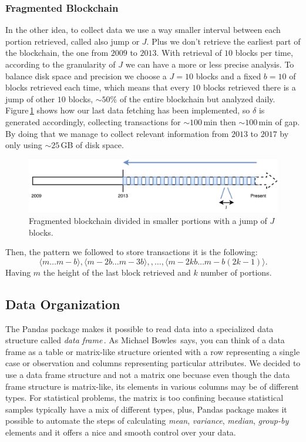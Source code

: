 \documentclass[USenglish]{uit-thesis}
\begin{document}
\subsubsection{Fragmented Blockchain}
In the other idea, to collect data we use a way smaller
interval between each portion
retrieved, called also jump or $J$. Plus
we don't retrieve the earliest part of the
blockchain, the one from $2009$ to $2013$.
With retrieval of $10$ blocks per time,
according to the granularity of $J$ we can
have a more or less precise analysis. To balance
disk space and precision we choose a $J = 10$ blocks
and a fixed $b = 10$ of blocks retrieved each time,
which means that every $10$ blocks retrieved there is
a jump of other $10$ blocks, $\sim$$50\%$ of the entire
blockchain but analyzed daily. Figure\,\ref{fig:portions_new}
shows how our last data fetching has been implemented,
so $\delta$ is generated accordingly, collecting transactions
for $\sim$$100$\,min then $\sim$$100$\,min of gap.
By doing that we manage to collect relevant
information from $2013$ to $2017$ by only
using $\sim$$25$\,GB of disk space.
\begin{figure}[h]
	\centering
	\includegraphics[width=1\textwidth]{img/portions_new}
	\caption{Fragmented blockchain divided in smaller portions with
	a jump of $J$ blocks.}
	\label{fig:portions_new}
\end{figure}
Then, the pattern we followed to store
transactions it is the following:
\[\langle m \dots m-b\rangle, \langle m-2b \dots m-3b\rangle,, \dots , \langle m-2kb \dots m - b(2k-1)\rangle.\]
Having $m$ the height of the last block retrieved and $k$ number
of portions.
\subsection{Data Organization}
\label{sec:dataorganization}
The Pandas package makes it possible
to read data into a specialized data structure
called \emph{data frame}\,\cite{pandas}.
As Michael Bowles\,\cite{bowles2015machine} says,
you can think of a data frame as a table or matrix-like
structure oriented with a row representing a single case
or observation and columns representing particular attributes.
We decided to use a data frame structure and not a
matrix one becuase even though the data frame structure
is matrix-like, its elements in various columns may be of
different types. For statistical problems, the matrix is too
confining because statistical samples typically have a mix
of different types, plus, Pandas package makes it possible
to automate the steps of calculating \emph{mean}, \emph{variance},
\emph{median}, \emph{group-by} elements and it
offers a nice and smooth control over your data. 
\end{document}
